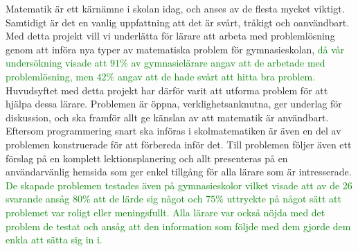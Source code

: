 \noindent \textcolor{Mahogany}{Matematik är ett kärnämne i skolan idag, och anses av de flesta mycket viktigt. Samtidigt är det en vanlig uppfattning att det är svårt, tråkigt och oanvändbart. Med detta projekt vill vi underlätta för lärare att arbeta med problemlösning genom att införa nya typer av matematiska problem för gymnasieskolan,} 
\textcolor{green}{då vår undersökning visade att $91\%$ av gymnasielärare angav att de arbetade med problemlösning, men $42\%$ angav att de hade svårt att hitta bra problem.}
\textcolor{Mahogany}{Huvudsyftet med detta projekt har därför varit att utforma problem för att hjälpa dessa lärare. Problemen är öppna, verklighetsanknutna, ger underlag för diskussion, och ska framför allt ge känslan av att matematik är användbart. Eftersom programmering snart ska införas i skolmatematiken är även en del av problemen konstruerade för att förbereda inför det.}
\textcolor{lila}{Till problemen följer även ett förslag på en komplett lektionsplanering och allt presenteras på en användarvänlig hemsida som ger enkel tillgång för alla lärare som är intresserade.}
\textcolor{green}{De skapade problemen testades även på gymnasieskolor vilket visade att av de 26 svarande ansåg $80\%$ att de lärde sig något och $75\%$ uttryckte på något sätt att problemet var roligt eller meningsfullt. Alla lärare var också nöjda med det problem de testat och ansåg att den information som följde med dem gjorde dem enkla att sätta sig in i.}

